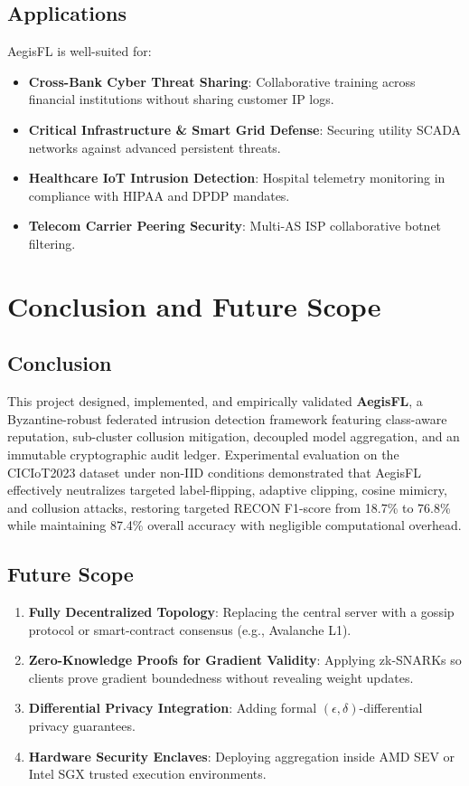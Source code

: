\documentclass[12pt,a4paper]{report}
\begin{document}
\section{Applications}
AegisFL is well-suited for:
\begin{itemize}
    \item \textbf{Cross-Bank Cyber Threat Sharing}: Collaborative training across financial institutions without sharing customer IP logs.
    \item \textbf{Critical Infrastructure \& Smart Grid Defense}: Securing utility SCADA networks against advanced persistent threats.
    \item \textbf{Healthcare IoT Intrusion Detection}: Hospital telemetry monitoring in compliance with HIPAA and DPDP mandates.
    \item \textbf{Telecom Carrier Peering Security}: Multi-AS ISP collaborative botnet filtering.
\end{itemize}

\newpage
\chapter{Conclusion and Future Scope}

\section{Conclusion}
This project designed, implemented, and empirically validated \textbf{AegisFL}, a Byzantine-robust federated intrusion detection framework featuring class-aware reputation, sub-cluster collusion mitigation, decoupled model aggregation, and an immutable cryptographic audit ledger. Experimental evaluation on the CICIoT2023 dataset under non-IID conditions demonstrated that AegisFL effectively neutralizes targeted label-flipping, adaptive clipping, cosine mimicry, and collusion attacks, restoring targeted RECON F1-score from 18.7\% to 76.8\% while maintaining 87.4\% overall accuracy with negligible computational overhead.

\section{Future Scope}
\begin{enumerate}
    \item \textbf{Fully Decentralized Topology}: Replacing the central server with a gossip protocol or smart-contract consensus (e.g., Avalanche L1).
    \item \textbf{Zero-Knowledge Proofs for Gradient Validity}: Applying zk-SNARKs so clients prove gradient boundedness without revealing weight updates.
    \item \textbf{Differential Privacy Integration}: Adding formal $(\epsilon, \delta)$-differential privacy guarantees.
    \item \textbf{Hardware Security Enclaves}: Deploying aggregation inside AMD SEV or Intel SGX trusted execution environments.
\end{enumerate}
\end{document}
